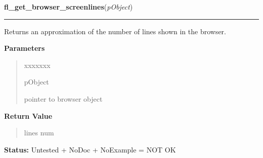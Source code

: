     \label{xformslib:library:fl_get_browser_screenlines}

    \vspace{0.5ex}

\hspace{.8\funcindent}\begin{boxedminipage}{\funcwidth}

    \raggedright \textbf{fl\_get\_browser\_screenlines}(\textit{pObject})

    \vspace{-1.5ex}

    \rule{\textwidth}{0.5\fboxrule}
\setlength{\parskip}{2ex}
    Returns an approximation of the number of lines shown in the browser.

\setlength{\parskip}{1ex}
      \textbf{Parameters}
      \vspace{-1ex}

      \begin{quote}
        \begin{Ventry}{xxxxxxx}

          \item[pObject]

          pointer to browser object

        \end{Ventry}

      \end{quote}

      \textbf{Return Value}
    \vspace{-1ex}

      \begin{quote}
      lines num

      \end{quote}

\textbf{Status:} Untested + NoDoc + NoExample = NOT OK



    \end{boxedminipage}

    \label{xformslib:library:fl_set_browser_topline}

    \vspace{0.5ex}

